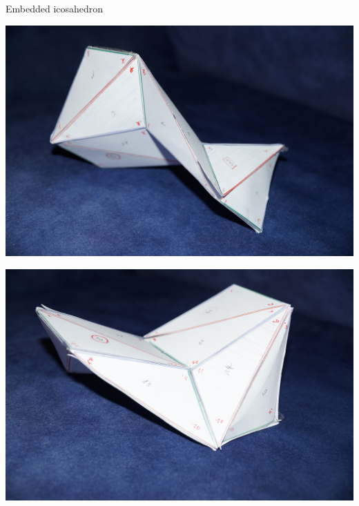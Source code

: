 \documentclass[11pt, handout]{beamer}
\begin{document}
\begin{frame}{Embedded icosahedron}
    \begin{minipage}{0.45\textwidth}
        \includegraphics[width=\textwidth]{DSC09508.JPG}
    \end{minipage}
    \begin{minipage}{0.45\textwidth}
        \includegraphics[width=\textwidth]{DSC09510.JPG}
    \end{minipage}
\end{frame}
            
\end{document}
